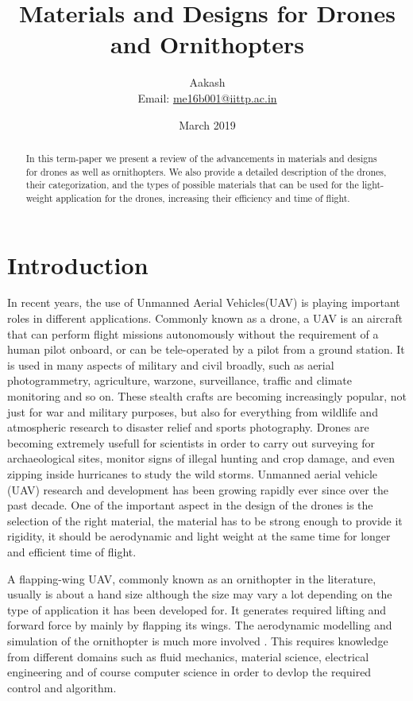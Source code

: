 \documentclass{article}
\title{Materials and Designs for Drones and Ornithopters}
\author{Aakash \\ Email: \href{mailto:me16b001@iittp.ac.in}{me16b001@iittp.ac.in}}
\date{March 2019}
\begin{document}
\maketitle

\begin{abstract}
In this term-paper we present a review of the advancements in materials and designs for drones as well as ornithopters. We also provide a detailed description of the drones, their categorization, and the types of possible materials that can be used for the light-weight application for the drones, increasing their efficiency and time of flight.
\end{abstract}

\section{Introduction}
In recent years, the use of Unmanned Aerial Vehicles(UAV) is playing important roles in different applications. Commonly known as a drone, a UAV is an aircraft that can perform flight missions autonomously without the requirement of a human pilot onboard, or can be tele-operated by a pilot from a ground station. It is used in many aspects of military and civil broadly, such as aerial photogrammetry, agriculture, warzone, surveillance, traffic and climate monitoring and so on. These stealth crafts are becoming increasingly popular, not just for war and military purposes, but also for everything from wildlife and atmospheric research to disaster relief and sports photography. Drones are becoming extremely usefull for scientists in order to carry out surveying for archaeological sites, monitor signs of illegal hunting and crop damage, and even zipping inside hurricanes to study the wild storms. 
Unmanned aerial vehicle (UAV) research and development has been growing rapidly ever since over the past decade. One of the important aspect in the design of the drones is the selection of the right material, the material has to be strong enough to provide it rigidity, it should be aerodynamic and light weight at the same time for longer and efficient time of flight.  

A flapping-wing UAV, commonly known as an ornithopter in the literature, usually is about a hand size although the size may vary a lot depending on the type of application it has been developed for. It generates required lifting and forward force by mainly by flapping its wings. The aerodynamic modelling and simulation of the ornithopter is much more involved \citep{peterson}. This requires knowledge from different domains such as fluid mechanics, material science, electrical engineering and of course computer science in order to devlop the required control and algorithm.
\end{document}

